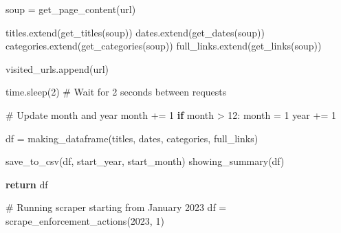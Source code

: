 \documentclass[
  letterpaper,
  DIV=11,
  numbers=noendperiod]{scrartcl}
\newenvironment{Shaded}{\begin{snugshade}}{\end{snugshade}}
\newcommand{\CommentTok}[1]{\textcolor[rgb]{0.37,0.37,0.37}{#1}}
\newcommand{\ControlFlowTok}[1]{\textcolor[rgb]{0.00,0.23,0.31}{\textbf{#1}}}
\newcommand{\DecValTok}[1]{\textcolor[rgb]{0.68,0.00,0.00}{#1}}
\newcommand{\NormalTok}[1]{\textcolor[rgb]{0.00,0.23,0.31}{#1}}
\newcommand{\OperatorTok}[1]{\textcolor[rgb]{0.37,0.37,0.37}{#1}}
\begin{document}
\begin{Shaded}
\begin{Highlighting}[]
\NormalTok{        soup }\OperatorTok{=}\NormalTok{ get\_page\_content(url)}
        
\NormalTok{        titles.extend(get\_titles(soup))}
\NormalTok{        dates.extend(get\_dates(soup))}
\NormalTok{        categories.extend(get\_categories(soup))}
\NormalTok{        full\_links.extend(get\_links(soup))}

\NormalTok{        visited\_urls.append(url)}
        
\NormalTok{        time.sleep(}\DecValTok{2}\NormalTok{)  }\CommentTok{\# Wait for 2 seconds between requests}
        
        \CommentTok{\# Update month and year}
\NormalTok{        month }\OperatorTok{+=} \DecValTok{1}
        \ControlFlowTok{if}\NormalTok{ month }\OperatorTok{\textgreater{}} \DecValTok{12}\NormalTok{:}
\NormalTok{            month }\OperatorTok{=} \DecValTok{1}
\NormalTok{            year }\OperatorTok{+=} \DecValTok{1}
    
\NormalTok{    df }\OperatorTok{=}\NormalTok{ making\_dataframe(titles, dates, categories, full\_links)}
    
\NormalTok{    save\_to\_csv(df, start\_year, start\_month)}
\NormalTok{    showing\_summary(df)}
    
    \ControlFlowTok{return}\NormalTok{ df}
\end{Highlighting}
\end{Shaded}

\begin{Shaded}
\begin{Highlighting}[]
\CommentTok{\# Running scraper starting from January 2023}
\NormalTok{df }\OperatorTok{=}\NormalTok{ scrape\_enforcement\_actions(}\DecValTok{2023}\NormalTok{, }\DecValTok{1}\NormalTok{)}
\end{Highlighting}
\end{Shaded}
\end{document}
